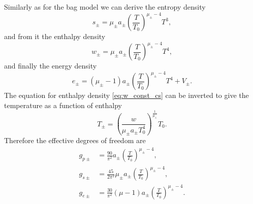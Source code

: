Similarly as for the bag model we can derive the entropy density
\begin{equation}
s_\pm = \mu_\pm a_\pm \left( \frac{T}{T_0} \right)^{\mu_\pm - 4} T^3,
\end{equation}
and from it the enthalpy density
\begin{equation}
w_\pm = \mu_\pm a_\pm \left( \frac{T}{T_0} \right)^{\mu_\pm - 4} T^4,
\label{eq:w_const_cs}
\end{equation}
and finally the energy density
\begin{equation}
e_\pm = (\mu_\pm - 1) a_\pm \left( \frac{T}{T_0} \right)^{\mu_\pm - 4} T^4 + V_\pm.
\end{equation}
The equation for enthalpy density \eqref{eq:w_const_cs} can be inverted to give the temperature as a function of enthalpy
\begin{equation}
T_\pm = \left( \frac{w}{\mu_\pm a_\pm T_0^4} \right)^\frac{1}{\mu_\pm} T_0.
\end{equation}
Therefore the effective degrees of freedom are
\begin{align}
g_{p\pm} &= \frac{90}{\pi^2} a_\pm \left( \frac{T}{T_0} \right)^{\mu_\pm - 4}, \\
g_{s\pm} &= \frac{45}{2\pi^2} \mu_\pm a_\pm \left( \frac{T}{T_0} \right)^{\mu_\pm - 4}, \\
g_{e\pm} &= \frac{30}{\pi^2} (\mu - 1) a_\pm \left( \frac{T}{T_0} \right)^{\mu_\pm - 4}.
\end{align}


